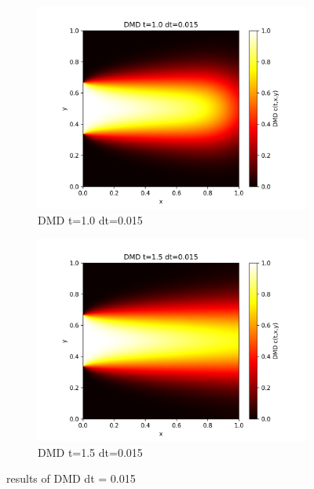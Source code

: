 \documentclass[11pt,a4 paper,one side]{article}
\begin{document}
\begin{figure}[htbp]
    \vspace{0.5cm}  %
    
    \begin{subfigure}{0.45\textwidth}
        \includegraphics[width=\textwidth]{DMD t=1.0 dt=0.015.png}
        \caption{DMD t=1.0 dt=0.015}
        \label{FDMD t=1.0 dt=0.015}
    \end{subfigure}
    \hfill
    \begin{subfigure}{0.45\textwidth}
        \includegraphics[width=\textwidth]{DMD t=1.5 dt=0.015.png}
        \caption{DMD t=1.5 dt=0.015}
        \label{DMD t=1.5 dt=0.015}
    \end{subfigure}
    \caption{results of DMD dt = 0.015}
    \label{results of DMD dt = 0.015}
\end{figure}
\end{document}
